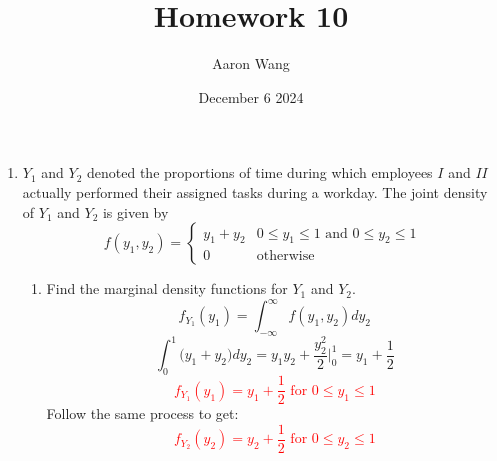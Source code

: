 \documentclass{article}
\title{Homework 10}
\author{Aaron Wang}
\date{December 6 2024}
\begin{document}
\maketitle
\begin{enumerate}

    \item $Y_1$ and $Y_2$ denoted the proportions of time during which employees $I$ and $II$ actually performed their assigned tasks during a workday. The joint density of $Y_1$ and $Y_2$ is given by
    \[
    f(y_1,y_2) = 
    \begin{cases}
    y_1+y_2 & 0 \leq y_1 \leq 1 \text{ and } 0 \leq y_2 \leq 1 \\
    0 & \text{otherwise}
    \end{cases}
    \]
    \begin{enumerate}
        \item Find the marginal density functions for $Y_1$ and $Y_2$.
        \[
            f_{Y_1}(y_1) = \int_{-\infty}^{\infty} f(y_1,y_2) dy_2
        \]
        \[
            \int_{0}^{1} \big(y_1+y_2\big) dy_2 = y_1y_2+\frac{y_2^2}{2}\Big|_0^1 = y_1+\frac{1}{2}
        \]
        \textcolor{red}{\[
            f_{Y_1}(y_1) = y_1+\frac{1}{2} \text{ for } 0 \leq y_1 \leq 1
        \]}
        Follow the same process to get:
        \textcolor{red}{\[
            f_{Y_2}(y_2) = y_2+\frac{1}{2} \text{ for } 0 \leq y_2 \leq 1
        \]}


\end{enumerate}
\end{enumerate}
\end{document}
